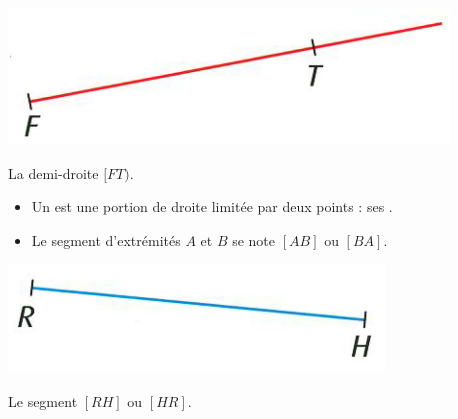 \begin{myex}
	\begin{center}
		\includegraphics[scale=0.55]{img/demi-droite}
	\end{center}

	 La demi-droite $[FT)$.
\end{myex}

\begin{mydef}
	\begin{itemize}
		\item Un  est une portion de droite limitée par deux points : ses .
		
		\item Le segment d'extrémités $A$ et $B$ se note $[AB]$ ou $[BA]$.
	\end{itemize}
\end{mydef}


\begin{myex}
	\begin{center}
		\includegraphics[scale=0.55]{img/segment}
	\end{center}
	
	Le segment $[RH]$ ou $[HR]$.
\end{myex}